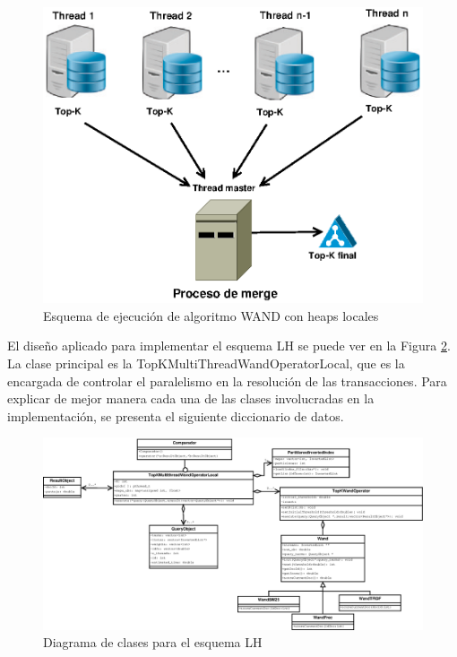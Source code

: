 \begin{figure}[!ht]
\centering
\includegraphics[scale=.75]{images/wand_heaps_locales.eps}
\caption{Esquema de ejecución de algoritmo WAND con heaps locales}
\label{fig:wand-heap-local}
\end{figure}

El diseño aplicado para implementar el esquema LH se puede ver en la Figura \ref{fig:TopKMultiThreadWandOperatorLocal}. La clase principal es la TopKMultiThreadWandOperatorLocal, que es la encargada de controlar el paralelismo en la resolución de las transacciones. Para explicar de mejor manera cada una de las clases involucradas en la implementación, se presenta el siguiente diccionario de datos.

\begin{figure}
\centering
\includegraphics[scale=.75]{images/TopKMultiThreadWandOperatorLocal.eps}
\caption{Diagrama de clases para el esquema LH}
\label{fig:TopKMultiThreadWandOperatorLocal}
\end{figure}

